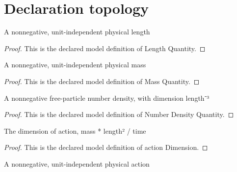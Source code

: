 \section{Declaration topology}
\begin{definition}
  \label{def:physics:phyx-mini-0616:phyxminiproblems-problemphyxmini0616-lengthquantity}
  A nonnegative, unit-independent physical length
\end{definition}
\begin{proof}
  This is the declared model definition of Length Quantity.
\end{proof}
\begin{definition}
  \label{def:physics:phyx-mini-0616:phyxminiproblems-problemphyxmini0616-massquantity}
  A nonnegative, unit-independent physical mass
\end{definition}
\begin{proof}
  This is the declared model definition of Mass Quantity.
\end{proof}
\begin{definition}
  \label{def:physics:phyx-mini-0616:phyxminiproblems-problemphyxmini0616-numberdensityquantity}
  A nonnegative free-particle number density, with dimension length⁻³
\end{definition}
\begin{proof}
  This is the declared model definition of Number Density Quantity.
\end{proof}
\begin{definition}
  \label{def:physics:phyx-mini-0616:phyxminiproblems-problemphyxmini0616-actiondimension}
  The dimension of action, mass * length² / time
\end{definition}
\begin{proof}
  This is the declared model definition of action Dimension.
\end{proof}
\begin{definition}
  \label{def:physics:phyx-mini-0616:phyxminiproblems-problemphyxmini0616-actionquantity}
  A nonnegative, unit-independent physical action
\end{definition}
